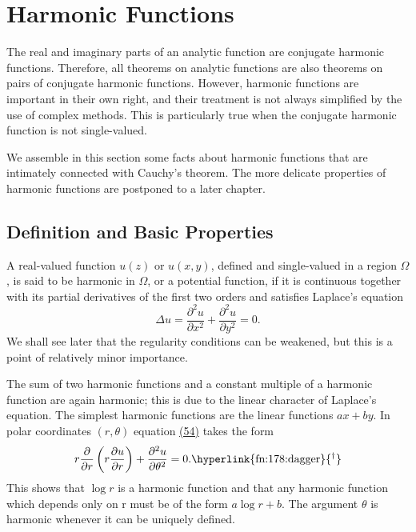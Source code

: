 \setcounter{section}{5}\section{Harmonic Functions}\label{sec:4.6}
The real and imaginary parts of an analytic function are conjugate harmonic functions. Therefore, all theorems on analytic functions are also theorems on pairs of conjugate harmonic functions. However, harmonic functions are important in their own right, and their treatment is not always simplified by the use of complex methods. This is particularly true when the conjugate harmonic function is not single-valued.

We assemble in this section some facts about harmonic functions that are intimately connected with Cauchy's theorem. The more delicate properties of harmonic functions are postponed to a later chapter.

\setcounter{section}{6}\setcounter{subsection}{0}\subsection{Definition and Basic Properties}\label{sec:4.6.1}
A real-valued function $u(z)$ or $u(x,y)$, defined and single-valued in a region $\Omega$, is said to be harmonic in $\Omega$, or a potential function, if it is continuous together with its partial derivatives of the first two orders and satisfies Laplace's equation
\begin{equation*}
\Delta u = \frac {\partial^ {2} u}{\partial x ^ {2}} + \frac {\partial^ {2} u}{\partial y ^ {2}} = 0.\tag{54}\label{eq:4.54}
\end{equation*}
We shall see later that the regularity conditions can be weakened, but this is a point of relatively minor importance.

The sum of two harmonic functions and a constant multiple of a harmonic function are again harmonic; this is due to the linear character of Laplace's equation. The simplest harmonic functions are the linear functions $ax + by$. In polar coordinates $(r, \theta)$ equation \hyperref[eq:4.54]{(54)} takes the form
\begin{equation*}
r \frac {\partial}{\partial r} \left(r \frac {\partial u}{\partial r}\right) + \frac {\partial^ {2} u}{\partial \theta^ {2}} = 0. \text{\hyperlink{fn:178:dagger}{\textsuperscript{\ensuremath{\dagger}}}}
\end{equation*}
This shows that $\log r$ is a harmonic function and that any harmonic function which depends only on r must be of the form $a \log r + b$. The argument $\theta$ is harmonic whenever it can be uniquely defined.

